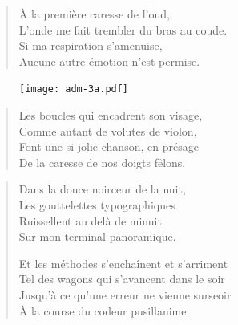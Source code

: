 \begin{verse}\quatrain
  À la première caresse de l’oud,\\  %
  L’onde me fait trembler du bras au coude.\\   %
  Si ma respiration s’amenuise,\\   %
  Aucune autre émotion n’est permise. 
\end{verse}

\begin{figure}[h]
  \centering
  \texttt{[image: adm-3a.pdf]}
  \captionsetup{labelformat=empty}
  \caption[Terminal ADM-3A]{}
\end{figure}




\begin{verse}\quatrain
  Les boucles qui encadrent son visage,\\  %
  Comme autant de volutes de violon,\\  %
  Font une si jolie chanson, en présage\\  %
  De la caresse de nos doigts fêlons.
\end{verse}

\begin{verse}\quatrain
  Dans la douce noirceur de la nuit,\\  %
  Les gouttelettes typographiques\\  %
  Ruissellent au delà de minuit\\  %
  Sur mon terminal panoramique.

  Et les méthodes
  s’enchaînent et s’arriment\\  %
  Tel des wagons qui s’avancent dans le soir\\  %
  Jusqu’à ce qu’une erreur ne vienne surseoir\\  %
  À la course du codeur pusillanime.
\end{verse}

